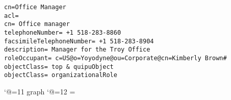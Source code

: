 
\scriptsize
\begin{verbatim}
cn=Office Manager
acl= 
cn= Office manager
telephoneNumber= +1 518-283-8860
facsimileTelephoneNumber= +1 518-283-8904
description= Manager for the Troy Office
roleOccupant= c=US@o=Yoyodyne@ou=Corporate@cn=Kimberly Brown#
objectClass= top & quipuObject
objectClass= organizationalRole

\end{verbatim}

\catcode`@=11
\expandafter\ifx\csname graph\endcsname\relax {}\box\chardef\insc@unt\graph\fi
\catcode`@=12
\setbox\graph=\empty
